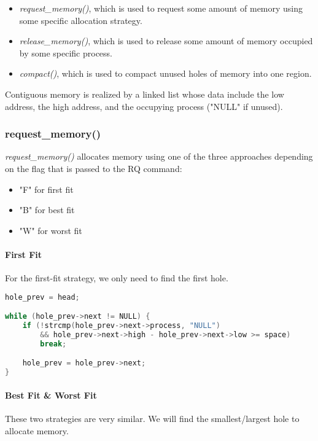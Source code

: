 \documentclass{article}
\begin{document}
\begin{itemize}
    \item \textit{request\_memory()}, which is used to request some amount of memory using some specific allocation strategy.
    \item \textit{release\_memory()}, which is used to release some amount of memory occupied by some specific process.
    \item \textit{compact()}, which is used to compact unused holes of memory into one region.
\end{itemize}

Contiguous memory is realized by a linked list whose data include the low address, the high address, and the occupying process ("NULL" if unused).

\subsubsection*{request\_memory()}
\textit{request\_memory()} allocates memory using one of the three approaches depending on the flag that is passed to the RQ command:

\begin{itemize}
    \item "F" for first fit
    \item "B" for best fit
    \item "W" for worst fit
\end{itemize}

\paragraph{First Fit}
For the first-fit strategy, we only need to find the first hole.
\begin{lstlisting}[language=c, caption={Finding the Hole with First-fit Strategy}]
hole_prev = head;

while (hole_prev->next != NULL) {
    if (!strcmp(hole_prev->next->process, "NULL") 
        && hole_prev->next->high - hole_prev->next->low >= space)
        break; 

    hole_prev = hole_prev->next;
}
\end{lstlisting}

\paragraph{Best Fit \& Worst Fit}
These two strategies are very similar. We will find the smallest/largest hole to allocate memory.
\end{document}
